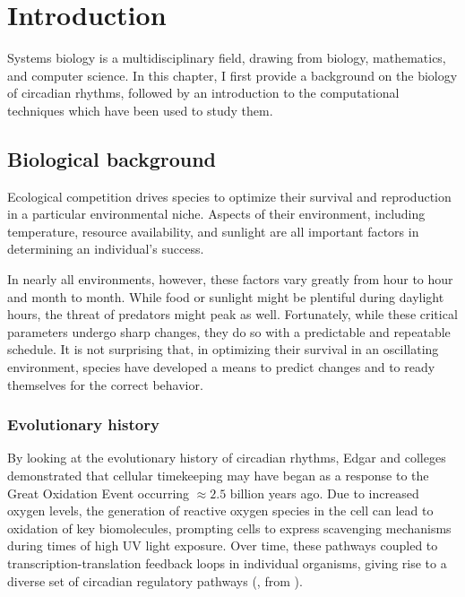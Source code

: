 \chapter{Introduction}
Systems biology is a multidisciplinary field, drawing from biology, mathematics, and computer science. 
In this chapter, I first provide a background on the biology of circadian rhythms, followed by an introduction to the computational techniques which have been used to study them. 

\section{Biological background}

Ecological competition drives species to optimize their survival and reproduction in a particular environmental niche. 
Aspects of their environment, including temperature, resource availability, and sunlight are all important factors in determining an individual's success.

In nearly all environments, however, these factors vary greatly from hour to hour and month to month. 
While food or sunlight might be plentiful during daylight hours, the threat of predators might peak as well. 
Fortunately, while these critical parameters undergo sharp changes, they do so with a predictable and repeatable schedule. 
It is not surprising that, in optimizing their survival in an oscillating environment, species have developed a means to predict changes and to ready themselves for the correct behavior.

\subsection{Evolutionary history}
By looking at the evolutionary history of circadian rhythms, Edgar and colleges \cite{Edgar2012} demonstrated that cellular timekeeping may have began as a response to the Great Oxidation Event occurring $\approx 2.5$ billion years ago. 
Due to increased oxygen levels, the generation of reactive oxygen species in the cell can lead to oxidation of key biomolecules, prompting cells to express scavenging mechanisms during times of high UV light exposure. 
Over time, these pathways coupled to transcription-translation feedback loops in individual organisms, giving rise to a diverse set of circadian regulatory pathways (, from \cite{Edgar2012}). 

